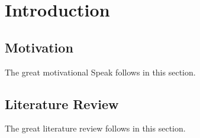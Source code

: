 \chapter{Introduction}\label{c:intro}

\section{Motivation}\label{c:intro:s:motivation}

The great motivational Speak follows in this section.

\section{Literature Review}\label{c:intro:s:literature}

The great literature review follows in this section.